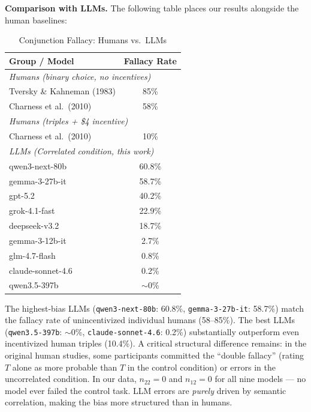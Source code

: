 \textbf{Comparison with LLMs.} The following table places our results alongside the human baselines:

\begin{table}[h!]
\centering
\caption{Conjunction Fallacy: Humans vs.\ LLMs}
\label{tab:human_vs_llm}
\begin{tabular}{lc}
\toprule
\textbf{Group / Model} & \textbf{Fallacy Rate} \\
\midrule
\multicolumn{2}{l}{\textit{Humans (binary choice, no incentives)}} \\
\quad Tversky \& Kahneman (1983)     & 85\% \\
\quad Charness et al.\ (2010)        & 58\% \\
\multicolumn{2}{l}{\textit{Humans (triples + \$4 incentive)}} \\
\quad Charness et al.\ (2010)        & 10\% \\
\midrule
\multicolumn{2}{l}{\textit{LLMs (Correlated condition, this work)}} \\
\quad qwen3-next-80b                 & 60.8\% \\
\quad gemma-3-27b-it                 & 58.7\% \\
\quad gpt-5.2                        & 40.2\% \\
\quad grok-4.1-fast                  & 22.9\% \\
\quad deepseek-v3.2                  & 18.7\% \\
\quad gemma-3-12b-it                 & 2.7\% \\
\quad glm-4.7-flash                  & 0.8\% \\
\quad claude-sonnet-4.6              & 0.2\% \\
\quad qwen3.5-397b                   & $\sim$0\% \\
\bottomrule
\end{tabular}
\end{table}

The highest-bias LLMs (\texttt{qwen3-next-80b}: 60.8\%, \texttt{gemma-3-27b-it}: 58.7\%) match the fallacy rate of unincentivized individual humans (58--85\%). The best LLMs (\texttt{qwen3.5-397b}: $\sim$0\%, \texttt{claude-sonnet-4.6}: 0.2\%) substantially outperform even incentivized human triples (10.4\%). A critical structural difference remains: in the original human studies, some participants committed the ``double fallacy'' (rating $T$ alone as more probable than $T$ in the control condition) or errors in the uncorrelated condition. In our data, $n_{22} = 0$ and $n_{12} = 0$ for all nine models --- no model ever failed the control task. LLM errors are \textit{purely} driven by semantic correlation, making the bias more structured than in humans.
